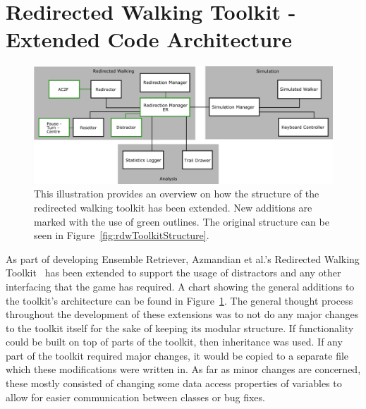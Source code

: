 \section{Redirected Walking Toolkit - Extended Code Architecture}
\begin{figure}[tbph]
    \centering
    \includegraphics[width=1.0\textwidth]{figures/graphs/ToolkitExtension.png}
    \caption[Extended Structure of the Redirected Walking Toolkit]{This illustration provides an overview on how the structure of the redirected walking toolkit has been extended. New additions are marked with the use of green outlines. The original structure can be seen in Figure~\ref{fig:rdwToolkitStructure}.}
    \label{fig:rdwToolkitExtendedStructure}
\end{figure}

As part of developing Ensemble Retriever, Azmandian et al.'s Redirected Walking Toolkit~\cite{azmandian2016redirected} has been extended to support the usage of distractors and any other interfacing that the game has required. A chart showing the general additions to the toolkit's architecture can be found in Figure~\ref{fig:rdwToolkitExtendedStructure}. The general thought process throughout the development of these extensions was to not do any major changes to the toolkit itself for the sake of keeping its modular structure. If functionality could be built on top of parts of the toolkit, then inheritance was used. If any part of the toolkit required major changes, it would be copied to a separate file which these modifications were written in. As far as minor changes are concerned, these mostly consisted of changing some data access properties of variables to allow for easier communication between classes or bug fixes.

